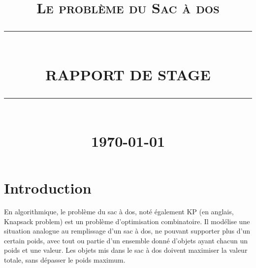 \documentclass[12pt]{report}
\newcommand{\HRule}[1]{\rule{\linewidth}{#1}}
\begin{document}
	\renewcommand{\contentsname}{Table des Matières}
	\author{}        
	\date{} 
	\title{  \textsc{ Le problème du Sac à dos}
		\\ [2.0cm]
		\HRule{0.5pt} \\
		\LARGE \textbf{\uppercase{Rapport de Stage }}
		\HRule{2pt} \\ [0.5cm]
		\normalsize \today \vspace*{5\baselineskip}}
	\maketitle
	\tableofcontents
	\renewcommand{\contentsname}
	\newpage
	\sectionfont{\scshape}
	
	\newpage
	\section*{Introduction}
	 \par{}
	 En algorithmique, le problème du sac à dos, noté également KP (en anglais, Knapsack problem) est un problème d'optimisation combinatoire. Il modélise une situation analogue au remplissage d'un sac à dos, ne pouvant supporter plus d'un certain poids, avec tout ou partie d'un ensemble donné d'objets ayant chacun un poids et une valeur. Les objets mis dans le sac à dos doivent maximiser la valeur totale, sans dépasser le poids maximum.
	 
		
		
\end{document}
